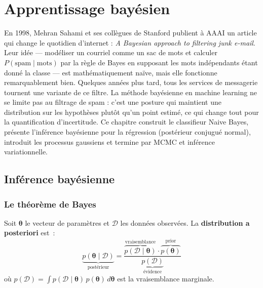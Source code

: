 \chapter{Apprentissage bay\'esien}
\label{ch:bayesien}

En 1998, Mehran Sahami et ses collègues de Stanford publient à AAAI un article qui change le quotidien d'internet : \emph{A Bayesian approach to filtering junk e-mail}. Leur idée --- modéliser un courriel comme un sac de mots et calculer $P(\text{spam} \mid \text{mots})$ par la règle de Bayes en supposant les mots indépendants étant donné la classe --- est mathématiquement naïve, mais elle fonctionne remarquablement bien. Quelques années plus tard, tous les services de messagerie tournent une variante de ce filtre. La méthode bayésienne en machine learning ne se limite pas au filtrage de spam : c'est une posture qui maintient une distribution sur les hypothèses plutôt qu'un point estimé, ce qui change tout pour la quantification d'incertitude. Ce chapitre construit le classifieur Naive Bayes, présente l'inférence bayésienne pour la régression (postérieur conjugué normal), introduit les processus gaussiens et termine par MCMC et inférence variationnelle.

\section{Inf\'erence bay\'esienne}
\label{sec:inference}

\subsection{Le th\'eor\`eme de Bayes}

\begin{theoreme}
Soit $\bm{\theta}$ le vecteur de param\`etres et $\mathcal{D}$ les donn\'ees
observ\'ees. La \textbf{distribution a posteriori} est~:
\begin{equation}
  \underbrace{p(\bm{\theta} \mid \mathcal{D})}_{\text{post\'erieur}} =
  \frac{\overbrace{p(\mathcal{D} \mid \bm{\theta})}^{\text{vraisemblance}}
  \cdot \overbrace{p(\bm{\theta})}^{\text{prior}}}
  {\underbrace{p(\mathcal{D})}_{\text{\'evidence}}}
  \label{eq:bayes}
\end{equation}
o\`u $p(\mathcal{D}) = \int p(\mathcal{D} \mid \bm{\theta})\,
p(\bm{\theta})\, d\bm{\theta}$ est la vraisemblance marginale.
\end{theoreme}

